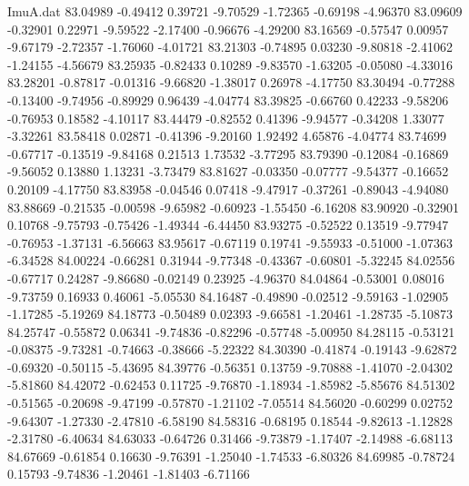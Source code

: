 \begin{filecontents}{ImuA.dat}
  83.04989   -0.49412    0.39721   -9.70529   -1.72365   -0.69198   -4.96370
  83.09609   -0.32901    0.22971   -9.59522   -2.17400   -0.96676   -4.29200
  83.16569   -0.57547    0.00957   -9.67179   -2.72357   -1.76060   -4.01721
  83.21303   -0.74895    0.03230   -9.80818   -2.41062   -1.24155   -4.56679
  83.25935   -0.82433    0.10289   -9.83570   -1.63205   -0.05080   -4.33016
  83.28201   -0.87817   -0.01316   -9.66820   -1.38017    0.26978   -4.17750
  83.30494   -0.77288   -0.13400   -9.74956   -0.89929    0.96439   -4.04774
  83.39825   -0.66760    0.42233   -9.58206   -0.76953    0.18582   -4.10117
  83.44479   -0.82552    0.41396   -9.94577   -0.34208    1.33077   -3.32261
  83.58418    0.02871   -0.41396   -9.20160    1.92492    4.65876   -4.04774
  83.74699   -0.67717   -0.13519   -9.84168    0.21513    1.73532   -3.77295
  83.79390   -0.12084   -0.16869   -9.56052    0.13880    1.13231   -3.73479
  83.81627   -0.03350   -0.07777   -9.54377   -0.16652    0.20109   -4.17750
  83.83958   -0.04546    0.07418   -9.47917   -0.37261   -0.89043   -4.94080
  83.88669   -0.21535   -0.00598   -9.65982   -0.60923   -1.55450   -6.16208
  83.90920   -0.32901    0.10768   -9.75793   -0.75426   -1.49344   -6.44450
  83.93275   -0.52522    0.13519   -9.77947   -0.76953   -1.37131   -6.56663
  83.95617   -0.67119    0.19741   -9.55933   -0.51000   -1.07363   -6.34528
  84.00224   -0.66281    0.31944   -9.77348   -0.43367   -0.60801   -5.32245
  84.02556   -0.67717    0.24287   -9.86680   -0.02149    0.23925   -4.96370
  84.04864   -0.53001    0.08016   -9.73759    0.16933    0.46061   -5.05530
  84.16487   -0.49890   -0.02512   -9.59163   -1.02905   -1.17285   -5.19269
  84.18773   -0.50489    0.02393   -9.66581   -1.20461   -1.28735   -5.10873
  84.25747   -0.55872    0.06341   -9.74836   -0.82296   -0.57748   -5.00950
  84.28115   -0.53121   -0.08375   -9.73281   -0.74663   -0.38666   -5.22322
  84.30390   -0.41874   -0.19143   -9.62872   -0.69320   -0.50115   -5.43695
  84.39776   -0.56351    0.13759   -9.70888   -1.41070   -2.04302   -5.81860
  84.42072   -0.62453    0.11725   -9.76870   -1.18934   -1.85982   -5.85676
  84.51302   -0.51565   -0.20698   -9.47199   -0.57870   -1.21102   -7.05514
  84.56020   -0.60299    0.02752   -9.64307   -1.27330   -2.47810   -6.58190
  84.58316   -0.68195    0.18544   -9.82613   -1.12828   -2.31780   -6.40634
  84.63033   -0.64726    0.31466   -9.73879   -1.17407   -2.14988   -6.68113
  84.67669   -0.61854    0.16630   -9.76391   -1.25040   -1.74533   -6.80326
  84.69985   -0.78724    0.15793   -9.74836   -1.20461   -1.81403   -6.71166

\end{filecontents}
